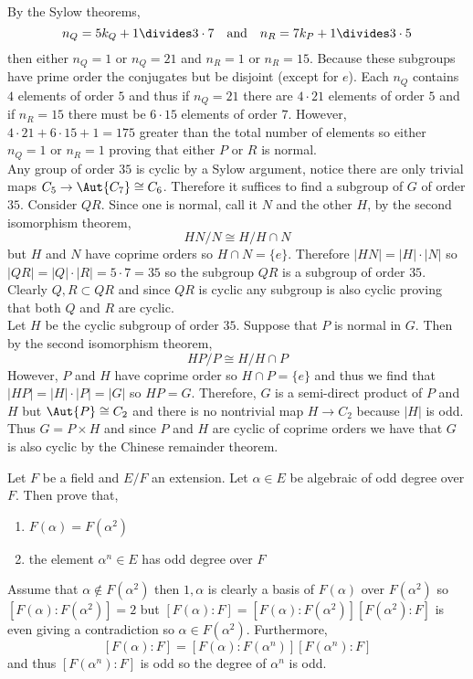 \documentclass[12pt]{article}
\begin{document}
By the Sylow theorems,
\[ n_Q = 5 k_Q + 1 \divides 3 \cdot 7 \quad \text{and} \quad n_R = 7 k_P + 1 \divides 3 \cdot 5 \]
then either $n_Q = 1$ or $n_Q = 21$ and $n_R = 1$ or $n_R = 15$. Because these subgroups have prime order the conjugates but be disjoint (except for $e$). Each $n_Q$ contains $4$ elements of order $5$ and thus if $n_Q = 21$ there are $4 \cdot 21$ elements of order $5$ and if $n_R = 15$ there must be $6 \cdot 15$ elements of order $7$. However, $4 \cdot 21 + 6 \cdot 15 + 1 = 175$ greater than the total number of elements so either $n_Q = 1$ or $n_R = 1$ proving that either $P$ or $R$ is normal.
\bigskip\\
Any group of order $35$ is cyclic by a Sylow argument, notice there are only trivial maps $C_5 \to \Aut{C_7} \cong C_6$. Therefore it suffices to find a subgroup of $G$ of order $35$. Consider $QR$. Since one is normal, call it $N$ and the other $H$, by the second isomorphism theorem,
\[ HN / N \cong H / H \cap N \]
but $H$ and $N$ have coprime orders so $H \cap N = \{ e \}$. Therefore $|HN| = |H| \cdot |N|$ so $|QR| = |Q| \cdot |R| = 5 \cdot 7 = 35$ so the subgroup $QR$ is a subgroup of order $35$.
\bigskip\\
Clearly $Q,R \subset QR$ and since $QR$ is cyclic any subgroup is also cyclic proving that both $Q$ and $R$ are cyclic.
\bigskip\\
Let $H$ be the cyclic subgroup of order $35$. Suppose that $P$ is normal in $G$. Then by the second isomorphism theorem,
\[ HP/P \cong H / H \cap P \]
However, $P$ and $H$ have coprime order so $H \cap P = \{ e \}$ and thus we find that $|HP| = |H| \cdot |P| = |G|$ so $HP = G$. Therefore, $G$ is a semi-direct product of $P$ and $H$ but $\Aut{P} \cong C_2$ and there is no nontrivial map $H \to C_2$ because $|H|$ is odd. Thus $G = P \times H$ and since $P$ and $H$ are cyclic of coprime orders we have that $G$ is also cyclic by the Chinese remainder theorem.

\begin{exercise}
Let $F$ be a field and $E / F$ an extension. Let $\alpha \in E$ be algebraic of odd degree over $F$. Then prove that,
\begin{enumerate}
\item $F(\alpha) = F(\alpha^2)$
\item the element $\alpha^n \in E$ has odd degree over $F$
\end{enumerate}
\end{exercise}

Assume that $\alpha \notin F(\alpha^2)$ then $1, \alpha$ is clearly a basis of $F(\alpha)$ over $F(\alpha^2)$ so $[F(\alpha) : F(\alpha^2)] = 2$ but $[F(\alpha) : F] = [F(\alpha) : F(\alpha^2)] [F(\alpha^2) : F]$ is even giving a contradiction so $\alpha \in F(\alpha^2)$. Furthermore, 
\[ [F(\alpha) : F] = [F(\alpha) : F(\alpha^n)] [F(\alpha^n) : F] \]
and thus $[F(\alpha^n) : F]$ is odd so the degree of $\alpha^n$ is odd.
\end{document}
